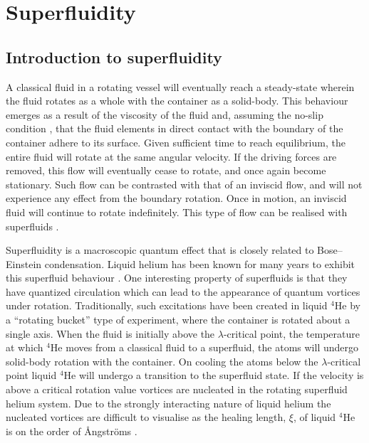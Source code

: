 \section{Superfluidity}\label{sec:superfluid}
\subsection{Introduction to superfluidity}
A classical fluid in a rotating vessel will eventually reach a steady-state wherein the fluid rotates as a whole with the container as a solid-body. This behaviour emerges as a result of the viscosity of the fluid and, assuming the no-slip condition \cite{FL:Day_2010}, that the fluid elements in direct contact with the boundary of the container adhere to its surface. Given sufficient time to reach equilibrium, the entire fluid will rotate at the same angular velocity. If the driving forces are removed, this flow will eventually cease to rotate, and once again become stationary. Such flow can be contrasted with that of an inviscid flow, and will not experience any effect from the boundary rotation. Once in motion, an inviscid fluid will continue to rotate indefinitely. This type of flow can be realised with superfluids \cite{BK:Prandtl_2010}.

Superfluidity is a macroscopic quantum effect that is closely related to Bose--Einstein condensation. Liquid helium has been known for many years to exhibit this superfluid behaviour \cite{BEC:Penrose_pr_1956}. One interesting property of superfluids is that they have quantized circulation which can lead to the appearance of quantum vortices under rotation. Traditionally, such excitations have been created in liquid $^4$He by a ``rotating bucket'' type of experiment, where the container is rotated about a single axis. When the fluid is initially above the $\lambda$-critical point, the temperature at which $^4$He moves from a classical fluid to a superfluid, the atoms will undergo solid-body rotation with the container. On cooling the atoms below the $\lambda$-critical point liquid $^4$He will undergo a transition to the superfluid state. If the velocity is above a critical rotation value vortices are nucleated in the rotating superfluid helium system. Due to the strongly interacting nature of liquid helium the nucleated vortices are difficult to visualise as the healing length, $\xi$, of liquid $^4$He is on the order of {\r{A}}ngstr{\"o}ms \cite{BEC:Srinivasen_pramana_2006}.

